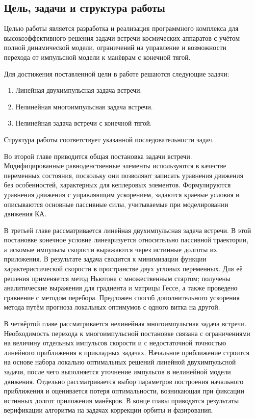 \subsection{Цель, задачи и структура работы}

Целью работы является разработка и реализация программного комплекса для высокоэффективного решения задачи встречи космических аппаратов с учётом полной динамической модели, ограничений на управление и возможности перехода от импульсной модели к манёврам с конечной тягой.

Для достижения поставленной цели в работе решаются следующие задачи:
\begin{enumerate}
    \item Линейная двухимпульсная задача встречи.
    \item Нелинейная многоимпульсная задача встречи.
    \item Нелинейная задача встречи с конечной тягой.
\end{enumerate}
Структура работы соответствует указанной последовательности задач.

Во второй главе приводится общая постановка задачи встречи. Модифицированные равноденственные элементы используются в качестве переменных состояния, поскольку они позволяют записать уравнения движения без особенностей, характерных для кеплеровых элементов. Формулируются уравнения движения с управляющим ускорением, задаются краевые условия и описываются основные пассивные силы, учитываемые при моделировании движения КА.

В третьей главе рассматривается линейная двухимпульсная задача встречи. В этой постановке конечное условие линеаризуется относительно пассивной траектории, а искомые импульсы скорости выражаются через истинные долготы их приложения. В результате задача сводится к минимизации функции характеристической скорости в пространстве двух угловых переменных. Для её решения применяется метод Ньютона с множественным стартом; получены аналитические выражения для градиента и матрицы Гессе, а также проведено сравнение с методом перебора. Предложен способ дополнительного ускорения метода путём прогноза локальных оптимумов с одного витка на другой.

В четвёртой главе рассматривается нелинейная многоимпульсная задача встречи. Необходимость перехода к многоимпульсной постановке связана с ограничениями на величину отдельных импульсов скорости и с недостаточной точностью линейного приближения в прикладных задачах. Начальное приближение строится на основе набора локально оптимальных решений линейной двухимпульсной задачи, после чего выполняется уточнение импульсов в нелинейной модели движения. Отдельно рассматривается выбор параметров построения начального приближения и оценивается потеря оптимальности, возникающая при фиксации истинных долгот приложения манёвров. В конце главы приводятся результаты верификации алгоритма на задачах коррекции орбиты и фазирования.

